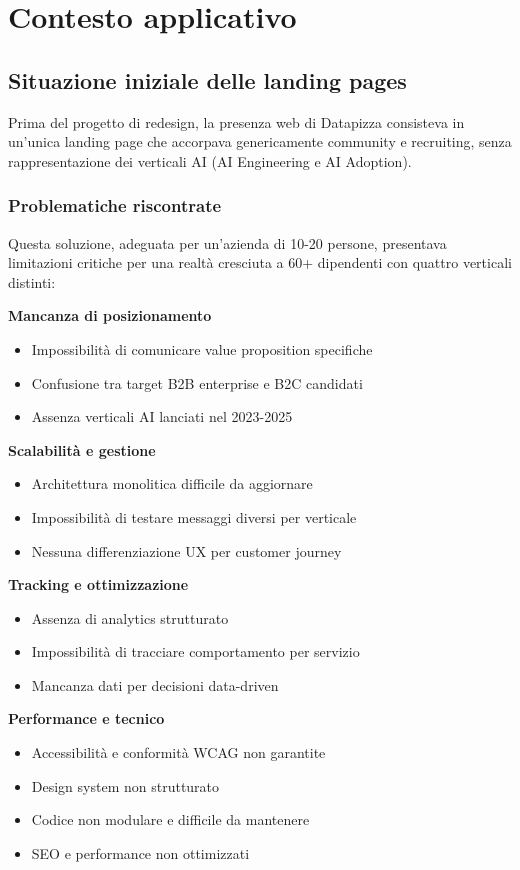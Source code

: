 \chapter{Contesto applicativo}

\section{Situazione iniziale delle landing pages}
Prima del progetto di redesign, la presenza web di Datapizza consisteva 
in un'unica landing page che accorpava genericamente community e 
recruiting, senza rappresentazione dei verticali AI (AI Engineering e 
AI Adoption).

\subsection{Problematiche riscontrate}
Questa soluzione, adeguata per un'azienda di 10-20 persone, presentava 
limitazioni critiche per una realtà cresciuta a 60+ dipendenti con 
quattro verticali distinti:

\textbf{Mancanza di posizionamento}
\begin{itemize}
  \item Impossibilità di comunicare value proposition specifiche
  \item Confusione tra target B2B enterprise e B2C candidati
  \item Assenza verticali AI lanciati nel 2023-2025
\end{itemize}

\textbf{Scalabilità e gestione}
\begin{itemize}
  \item Architettura monolitica difficile da aggiornare
  \item Impossibilità di testare messaggi diversi per verticale
  \item Nessuna differenziazione UX per customer journey
\end{itemize}

\textbf{Tracking e ottimizzazione}
\begin{itemize}
  \item Assenza di analytics strutturato
  \item Impossibilità di tracciare comportamento per servizio
  \item Mancanza dati per decisioni data-driven
\end{itemize}

\textbf{Performance e tecnico}
\begin{itemize}
  \item Accessibilità e conformità WCAG non garantite
  \item Design system non strutturato
  \item Codice non modulare e difficile da mantenere
  \item SEO e performance non ottimizzati
\end{itemize}

